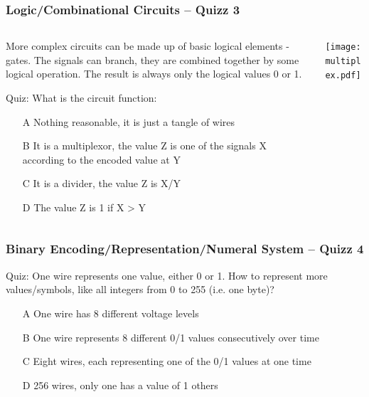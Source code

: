 \documentclass{beamer}
\begin{document}
\begin{frame}
\frametitle{Logic/Combinational Circuits -- Quizz 3}

\begin{columns}
\begin{column}{0.55\textwidth}

More complex circuits can be made up of basic logical elements - gates. The signals can branch, they are combined together by some logical operation. The result is always only the logical values 0 or 1.

\bigskip

Quiz: What is the circuit function:
\begin{itemize}
\item[A] Nothing reasonable, it is just a tangle of wires
\item[B] It is a multiplexor, the value Z is one of the signals X according to the encoded value at Y
\item[C] It is a divider, the value Z is X/Y
\item[D] The value Z is 1 if X > Y
\end{itemize}
\end{column}
\begin{column}{0.45\textwidth}
\begin{center}
   \texttt{[image: multiplex.pdf]}
\end{center}
\end{column}
\end{columns}


\end{frame}


\begin{frame}
\frametitle{Binary Encoding/Representation/Numeral System -- Quizz 4}

Quiz: One wire represents one value, either 0 or 1. How to represent more values/symbols, like all integers from 0 to 255 (i.e. one byte)?
\begin{itemize}
\item[A] One wire has 8 different voltage levels
\item[B] One wire represents 8 different 0/1 values consecutively over time
\item[C] Eight wires, each representing one of the 0/1 values at one time
\item[D] 256 wires, only one has a value of 1 others
\end{itemize}

\end{frame}
\end{document}

